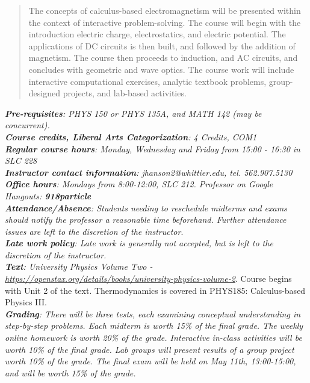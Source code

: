 \documentclass[10pt]{article}
\begin{document}
\maketitle

\begin{abstract}
The concepts of calculus-based electromagnetism will be presented within the context of interactive problem-solving.  The course will begin with the introduction electric charge, electrostatics, and electric potential.  The applications of DC circuits is then built, and followed by the addition of magnetism.  The course then proceeds to induction, and AC circuits, and concludes with geometric and wave optics.  The course work will include interactive computational exercises, analytic textbook problems, group-designed projects, and lab-based activities.
\end{abstract}
\noindent
\textit{\textbf{Pre-requisites}: PHYS 150 or PHYS 135A, and MATH 142 (may be concurrent).} \\
\textit{\textbf{Course credits, Liberal Arts Categorization}: 4 Credits, COM1} \\
\textit{\textbf{Regular course hours}: Monday, Wednesday and Friday from 15:00 - 16:30 in SLC 228} \\
\textit{\textbf{Instructor contact information}: jhanson2@whittier.edu, tel. 562.907.5130} \\
\textit{\textbf{Office hours}: Mondays from 8:00-12:00, SLC 212. Professor on Google Hangouts: \textbf{918particle}} \\
\textit{\textbf{Attendance/Absence}: Students needing to reschedule midterms and exams should notify the professor a reasonable time beforehand. Further attendance issues are left to the discretion of the instructor}.\\ 
\textit{\textbf{Late work policy}: Late work is generally not accepted, but is left to the discretion of the instructor.} \\
\textit{\textbf{Text}: University Physics Volume Two - \url{https://openstax.org/details/books/university-physics-volume-2}}.  Course begins with Unit 2 of the text.  Thermodynamics is covered in PHYS185: Calculus-based Physics III. \\
\textit{\textbf{Grading}: There will be three tests, each examining conceptual understanding in step-by-step problems. Each
midterm is worth 15\% of the final grade. The weekly online homework is worth 20\% of the grade. Interactive
in-class activities will be worth 10\% of the final grade. Lab groups will present results of a group project worth 10\% of the grade.  The final exam will be held on May 11th, 13:00-15:00, and will be worth 15\% of the grade.} \\
\end{document}
